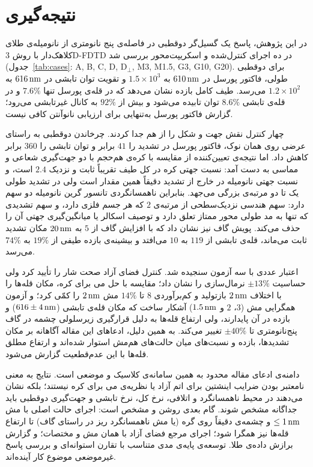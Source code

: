 \section{نتیجه‌گیری}
\label{sec:conclusion}

در این پژوهش، پاسخ یک گسیل‌گر دوقطبی در فاصله‌ی پنج نانومتری از نانومیله‌ی
طلای کلاهک‌دار با روش 3D-FDTD در ده اجرای کنترل‌شده و اسکریپت‌محور
بررسی شد (جدول~\ref{tab:cases}: A, B, C, D, D$_\perp$, M3, M1.5, G3, G10, G20). برای دوقطبی طولی، فاکتور پورسل در $610\,\text{nm}$ به $1.5\times10^{3}$
و تقویت توان تابشی در $616\,\text{nm}$ به $1.2\times10^{2}$ می‌رسد. طیف کامل
بازده نشان می‌دهد که در قله‌ی پورسل تنها $7.6\%$ و در قله‌ی تابشی
$8.6\%$ توان تابیده می‌شود و بیش از $92\%$ به کانال غیرتابشی می‌رود؛
گزارش فاکتور پورسل به‌تنهایی برای ارزیابی نانوآنتن کافی نیست.

چهار کنترل نقش جهت و شکل را از هم جدا کردند. چرخاندن دوقطبی به راستای
عرضی روی همان نوک، فاکتور پورسل در تشدید را $41$ برابر و توان تابشی را
$360$ برابر کاهش داد. اما نتیجه‌ی تعیین‌کننده از مقایسه با کره‌ی هم‌حجم
با دو جهت‌گیری شعاعی و مماسی به دست آمد: نسبت جهتی کره در کل طیف
تقریباً ثابت و نزدیک $2.4$ است، و نسبت جهتی نانومیله در خارج از تشدید
دقیقاً همین مقدار است ولی در تشدید طولی یک تا دو مرتبه‌ی بزرگی می‌جهد.
بنابراین ناهمسانگردی تانسور گرین نانومیله دو سهم دارد: سهم هندسی
نزدیک‌سطحی از مرتبه‌ی $2$ که هر جسم فلزی دارد، و سهم تشدیدی که تنها به
مد طولی محور ممتاز تعلق دارد و توصیف اسکالر یا میانگین‌گیری جهتی آن را
حذف می‌کند. پویش گاف نیز نشان داد که با افزایش گاف از $5$ به $20\,\text{nm}$
مکان تشدید ثابت می‌ماند، قله‌ی تابشی از $119$ به $10$ می‌افتد و بیشینه‌ی
بازده طیفی از $19\%$ به $74\%$ می‌رسد.

اعتبار عددی با سه آزمون سنجیده شد. کنترل فضای آزاد صحت شار را تأیید کرد
ولی حساسیت $\pm13\%$ نرمال‌سازی را نشان داد؛ مقایسه با حل می برای کره،
مکان قله‌ها را با اختلاف $2\,\text{nm}$ بازتولید و کم‌برآوردی $8$ تا $14\%$
مش $2\,\text{nm}$ را کمّی کرد؛ و آزمون همگرایی مش ($3$، $2$ و $1.5\,\text{nm}$)
آشکار ساخت که مکان قله‌ی تابشی ($616\pm4\,\text{nm}$) و بازده در آن پایدارند،
ولی ارتفاع قله‌ها به دلیل قرارگیری زیرسلولی چشمه در گاف پنج‌نانومتری
تا $\pm40\%$ تغییر می‌کند. به همین دلیل، ادعاهای این مقاله آگاهانه بر
مکان تشدیدها، بازده و نسبت‌های میان حالت‌های هم‌مش استوار شده‌اند و
ارتفاع مطلق قله‌ها با این عدم‌قطعیت گزارش می‌شود.

دامنه‌ی ادعای مقاله محدود به همین سامانه‌ی کلاسیک و موضعی است. نتایج به
معنی نامعتبر بودن ضرایب اینشتین برای اتم آزاد یا نظریه‌ی می برای کره
نیستند؛ بلکه نشان می‌دهند در محیط ناهمسانگرد و اتلافی، نرخ کل، نرخ تابشی
و جهت‌گیری دوقطبی باید جداگانه مشخص شوند. گام بعدی روشن و مشخص است:
اجرای حالت اصلی با مش $\le1\,\text{nm}$ و چشمه‌ی دقیقاً روی گره (یا مش
ناهمسانگرد ریز در راستای گاف) تا ارتفاع قله‌ها نیز همگرا شود؛ اجرای
مرجع فضای آزاد با همان مش و مختصات؛ و گزارش برازش داده‌ی طلا. توسعه‌ی
پایه‌ی مدی متناسب با تقارن استوانه‌ای
\cite[pp.~123--131]{maier2007plasmonics} و بررسی پاسخ غیرموضعی موضوع
کار آینده‌اند.

